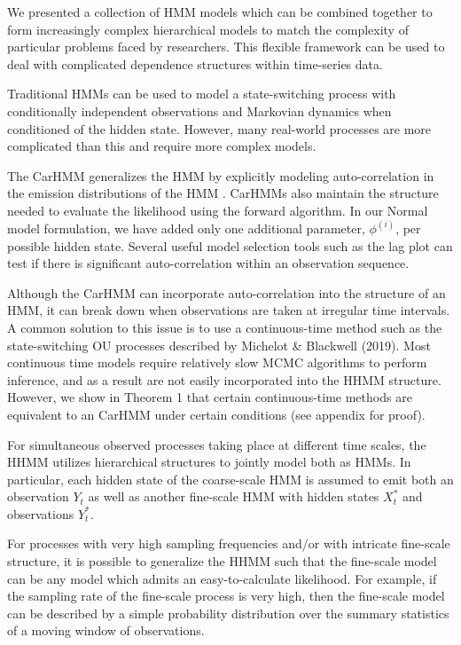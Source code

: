 

We presented a collection of HMM models which can be combined together to form increasingly complex hierarchical models to match the complexity of particular problems faced by researchers. This flexible framework can be used to deal with complicated dependence structures within time-series data.

Traditional HMMs can be used to model a state-switching process with conditionally independent observations and Markovian dynamics when conditioned of the hidden state. However, many real-world processes are more complicated than this and require more complex models.

The CarHMM generalizes the HMM by explicitly modeling auto-correlation in the emission distributions of the HMM \citep{Lawler:2019}. CarHMMs also maintain the structure needed to evaluate the likelihood using the forward algorithm. In our Normal model formulation, we have added only one additional parameter, $\phi^{(i)}$, per possible hidden state. Several useful model selection tools such as the lag plot can test if there is significant auto-correlation within an observation sequence.

Although the CarHMM can incorporate auto-correlation into the structure of an HMM, it can break down when observations are taken at irregular time intervals. A common solution to this issue is to use a continuous-time method such as the state-switching OU processes described by Michelot \& Blackwell (2019). Most continuous time models require relatively slow MCMC algorithms to perform inference, and as a result are not easily incorporated into the HHMM structure. However, we show in Theorem 1 that certain continuous-time methods are equivalent to an CarHMM under certain conditions (see appendix for proof).

For simultaneous observed processes taking place at different time scales, the HHMM \citep{Barajas:2017,Adam:2019} utilizes hierarchical structures to jointly model both as HMMs. In particular, each hidden state of the coarse-scale HMM is assumed to emit both an observation $Y_t$ as well as another fine-scale HMM with hidden states $X^*_t$ and observations $Y^*_t$. 

For processes with very high sampling frequencies and/or with intricate fine-scale structure, it is possible to generalize the HHMM such that the fine-scale model can be any model which admits an easy-to-calculate likelihood. For example, if the sampling rate of the fine-scale process is very high, then the fine-scale model can be described by a simple probability distribution over the summary statistics of a moving window of observations. 

